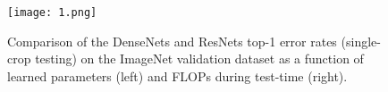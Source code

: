 \documentclass[10pt,letterpaper]{article}
\begin{document}
\begin{figure}[htbp]
\begin{center}
\texttt{[image: 1.png]}
\caption{Comparison of the DenseNets and ResNets top-1 error rates (single-crop testing) on the ImageNet validation dataset as a function of learned parameters (left) and FLOPs during test-time (right).}
\label{fig}
\end{center}
\end{figure}
\begin{multicols}{2}
{\small

	
}
\end{multicols}
\end{document}
